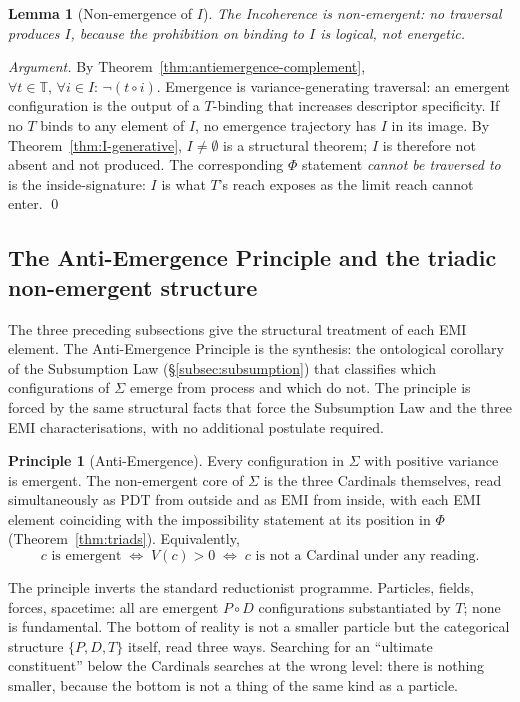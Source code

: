 \documentclass[11pt,a4paper]{article}
\newtheorem{lemma}[theorem]{Lemma}
\theoremstyle{definition}
\newtheorem{principle}[theorem]{Principle}
\theoremstyle{remark}
\begin{document}
\begin{lemma}[Non-emergence of $I$]\label{lem:emergent-I}
The Incoherence is non-emergent: no traversal produces $I$, because the prohibition on binding to $I$ is logical, not energetic.
\end{lemma}

\begin{proof}[Argument]
By Theorem~\ref{thm:antiemergence-complement}, $\forall t \in \mathbb{T},\,\forall i \in I :\, \neg(t \circ i)$. Emergence is variance-generating traversal: an emergent configuration is the output of a $T$-binding that increases descriptor specificity. If no $T$ binds to any element of $I$, no emergence trajectory has $I$ in its image. By Theorem~\ref{thm:I-generative}, $I \neq \emptyset$ is a structural theorem; $I$ is therefore not absent and not produced. The corresponding $\Phi$ statement \emph{cannot be traversed to} is the inside-signature: $I$ is what $T$'s reach exposes as the limit reach cannot enter. \qed
\end{proof}

\subsection{The Anti-Emergence Principle and the triadic non-emergent structure}\label{subsec:antiemergence}

The three preceding subsections give the structural treatment of each EMI element. The Anti-Emergence Principle is the synthesis: the ontological corollary of the Subsumption Law (\S\ref{subsec:subsumption}) that classifies which configurations of $\Sigma$ emerge from process and which do not. The principle is forced by the same structural facts that force the Subsumption Law and the three EMI characterisations, with no additional postulate required.

\begin{principle}[Anti-Emergence]\label{princ:antiemergence}
Every configuration in $\Sigma$ with positive variance is emergent. The non-emergent core of $\Sigma$ is the three Cardinals themselves, read simultaneously as $\mathrm{PDT}$ from outside and as $\mathrm{EMI}$ from inside, with each EMI element coinciding with the impossibility statement at its position in $\Phi$ (Theorem~\ref{thm:triads}). Equivalently,
\[
c \text{ is emergent} \;\Longleftrightarrow\; V(c) > 0 \;\Longleftrightarrow\; c \text{ is not a Cardinal under any reading.}
\]
\end{principle}

The principle inverts the standard reductionist programme. Particles, fields, forces, spacetime: all are emergent $P\circ D$ configurations substantiated by $T$; none is fundamental. The bottom of reality is not a smaller particle but the categorical structure $\{P,D,T\}$ itself, read three ways. Searching for an ``ultimate constituent'' below the Cardinals searches at the wrong level: there is nothing smaller, because the bottom is not a thing of the same kind as a particle.
\end{document}

